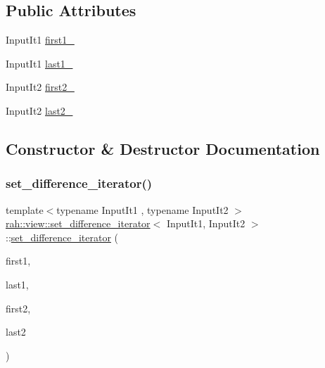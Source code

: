 \subsection*{Public Attributes}
\begin{DoxyCompactItemize}
\item 
Input\+It1 \mbox{\hyperlink{structrah_1_1view_1_1set__difference__iterator_a665b0687714ecb87cc12a60fe83a4a9c}{first1\+\_\+}}
\item 
Input\+It1 \mbox{\hyperlink{structrah_1_1view_1_1set__difference__iterator_a98361382232dd506608cc7a795870eae}{last1\+\_\+}}
\item 
Input\+It2 \mbox{\hyperlink{structrah_1_1view_1_1set__difference__iterator_a6c5c47d695dc5c8d45d2a3261af88940}{first2\+\_\+}}
\item 
Input\+It2 \mbox{\hyperlink{structrah_1_1view_1_1set__difference__iterator_aec1d3823ab15bd54cffcdf4980ef5595}{last2\+\_\+}}
\end{DoxyCompactItemize}


\subsection{Constructor \& Destructor Documentation}
\mbox{\label{structrah_1_1view_1_1set__difference__iterator_a2aaa5bc00b8c0e21a9b4a4ae9fee4068}} 
\subsubsection{\texorpdfstring{set\_difference\_iterator()}{set\_difference\_iterator()}}
{\footnotesize\ttfamily template$<$typename Input\+It1 , typename Input\+It2 $>$ \\
\mbox{\hyperlink{structrah_1_1view_1_1set__difference__iterator}{rah\+::view\+::set\+\_\+difference\+\_\+iterator}}$<$ Input\+It1, Input\+It2 $>$\+::\mbox{\hyperlink{structrah_1_1view_1_1set__difference__iterator}{set\+\_\+difference\+\_\+iterator}} (\begin{DoxyParamCaption}\item[{Input\+It1}]{first1,  }\item[{Input\+It1}]{last1,  }\item[{Input\+It2}]{first2,  }\item[{Input\+It2}]{last2 }\end{DoxyParamCaption})\hspace{0.3cm}{\ttfamily [inline]}}



